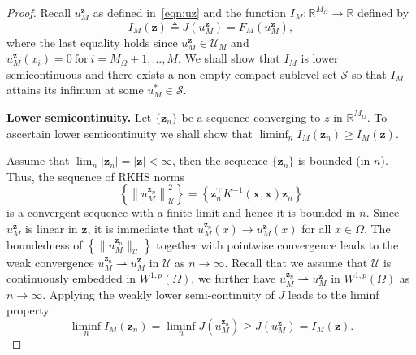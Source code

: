 \documentclass[10pt,a4paper]{amsart}
\begin{document}
\begin{proof}
Recall $u_M^{\boldsymbol{z}}$ as defined in~\eqref{eqn:uz}
and the function $I_M: \mathbb{R}^{M_{\Omega}} \to \mathbb{R}$ defined by
  \[
    I_M(\boldsymbol{z}) \triangleq
    J\left(u_M^{\boldsymbol{z}}\right) = F_M\left(u_M^{\boldsymbol{z}}\right),
  \]
  where the last equality holds since
  $u_M^{\boldsymbol{z}} \in \mathcal{U}_M$ and
  $u_M^{\boldsymbol{z}}(x_i) = 0 ~\text{for}~ i = M_{\Omega}+1,\ldots,
  M$.  
We shall show that $I_M$ is lower semicontinuous and there exists a non-empty compact sublevel set $\mathcal{S}$ so that $I_M$ attains its infimum at some $u_M^* \in \mathcal{S}$.  
  
  
{\bf Lower semicontinuity.}  Let $\{\boldsymbol{z}_n\}$ be a
  sequence converging to $z$ in $\mathbb{R}^{M_{\Omega}}$. To
  ascertain lower semicontinuity we shall show that
  $\liminf_n I_M(\boldsymbol{z}_n) \geq I_M(\boldsymbol{z})$. 
  
  
  
  Assume that
  $\lim_n |\boldsymbol{z}_n| = |\boldsymbol{z}| < \infty$, then the sequence
  $\{\boldsymbol{z}_n\}$ is bounded (in $n$). Thus, the sequence of
  RKHS norms
   \[\left\{\left\|u_M^{\boldsymbol{z}_n}\right\|_{\mathcal{U}}^2\right\} = \left\{\boldsymbol{z}_n^{\text{T}} K^{-1}(\boldsymbol{x}, \boldsymbol{x})  \boldsymbol{z}_n\right\}\] 
   is a convergent sequence with a finite limit and hence it is bounded in $n$.  Since $u_M^{\boldsymbol{z}}$ is linear in $\boldsymbol{z}$,
  it is immediate that
  $u_M^{\boldsymbol{z}_n}(x) \to u_M^{\boldsymbol{z}}(x)$ for all
  $x \in \Omega$. The boundedness of
  $\left\{\|u_M^{\boldsymbol{z}_n}\|_{\mathcal{U}}\right\}$ together with
  pointwise convergence leads to the weak convergence
  $u_M^{\boldsymbol{z}_n} \rightharpoonup u_M^{\boldsymbol{z}}$ in
  $\mathcal{U}$ as $n \to \infty$.  Recall that we assume that  $\mathcal{U}$ is
  continuously embedded in $W^{1,p}(\Omega)$, we further have
  $u_M^{\boldsymbol{z}_n} \rightharpoonup u_M^{\boldsymbol{z}}$ in
  $W^{1,p}(\Omega)$ as $n \to \infty$.  Applying the
  weakly lower semi-continuity of $J$ leads to the liminf property
\[
  \liminf_n I_M({\boldsymbol{z}_n}) = \liminf_n
  J\left(u_M^{\boldsymbol{z}_n}\right) \geq J\left(u_M^{\boldsymbol{z}}\right) =
  I_M({\boldsymbol{z}}).
\]
  
  
  
  

\end{proof}
\end{document}
